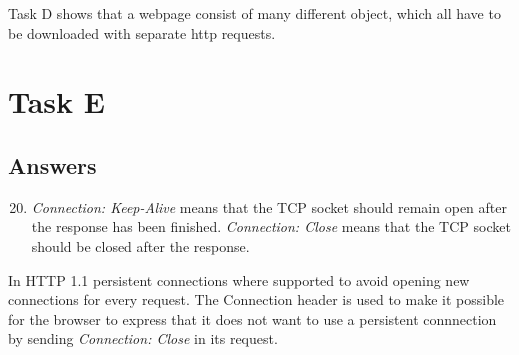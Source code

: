 \documentclass[a4paper,11pt]{article}
\begin{document}
Task D shows that a webpage consist of many different object, which all have to be downloaded with separate http requests.

\section{Task E}

\subsection{Answers}
\begin{enumerate}
    \setcounter{enumi}{19}
  \item \emph{Connection: Keep-Alive} means that the TCP socket should remain open after the response has been finished.
    \emph{Connection: Close} means that the TCP socket should be closed after the response.
\end{enumerate}

In HTTP 1.1 persistent connections where supported to avoid opening new connections for every request.
The Connection header is used to make it possible for the browser to express that it does not want to use a persistent connnection by sending \emph{Connection: Close} in its request.

\end{document}
